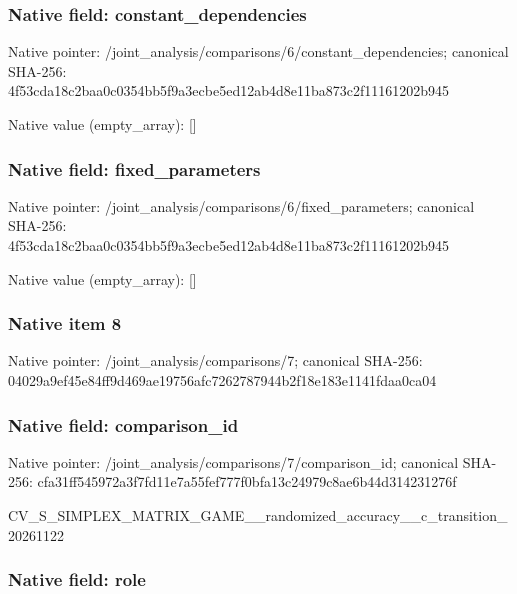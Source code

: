 \documentclass[10pt,a4paper]{article}
\begin{document}
\subsubsection{Native field: constant\_dependencies}


Native pointer: /joint\_analysis/comparis\allowbreak{}ons/6/constant\_dependenc\allowbreak{}ies; canonical SHA-256: 4f53cda18c2baa0c0354bb5f\allowbreak{}9a3ecbe5ed12ab4d8e11ba87\allowbreak{}3c2f11161202b945



Native value (empty\_array): []



\subsubsection{Native field: fixed\_parameters}


Native pointer: /joint\_analysis/comparis\allowbreak{}ons/6/fixed\_parameters; canonical SHA-256: 4f53cda18c2baa0c0354bb5f\allowbreak{}9a3ecbe5ed12ab4d8e11ba87\allowbreak{}3c2f11161202b945



Native value (empty\_array): []



\subsubsection{Native item 8}


Native pointer: /joint\_analysis/comparisons/7; canonical SHA-256: 04029a9ef45e84ff9d469ae1\allowbreak{}9756afc7262787944b2f18e1\allowbreak{}83e1141fdaa0ca04



\subsubsection{Native field: comparison\_id}


Native pointer: /joint\_analysis/comparis\allowbreak{}ons/7/comparison\_id; canonical SHA-256: cfa31ff545972a3f7fd11e7a\allowbreak{}55fef777f0bfa13c24979c8a\allowbreak{}e6b44d314231276f


CV\_S\_SIMPLEX\_MATRIX\_GAME\allowbreak{}\_\_randomized\_accuracy\_\_c\allowbreak{}\_transition\_20261122


\subsubsection{Native field: role}
\end{document}
